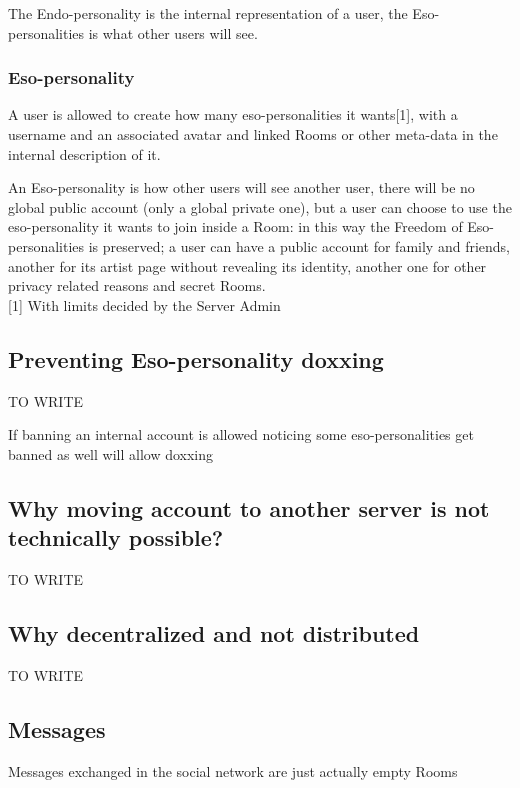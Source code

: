 \documentclass[12pt]{article}
\begin{document}
The Endo-personality is the internal representation of a user, the Eso-personalities is what other users will see.

\subsubsection*{Eso-personality}

A user is allowed to create how many eso-personalities it wants[1], with a username and an associated avatar and linked Rooms or other meta-data in the internal description of it.

An Eso-personality is how other users will see another user, there will be no global public account (only a global private one), but a user can choose to use the eso-personality it wants to join inside a Room: in this way the Freedom of Eso-personalities is preserved; a user can have a public account for family and friends, another for its artist page without revealing its identity, another one for other privacy related reasons and secret Rooms. \\

[1] With limits decided by the Server Admin

\subsection{Preventing Eso-personality doxxing}

TO WRITE

If banning an internal account is allowed noticing some eso-personalities get banned as well will allow doxxing

\subsection{Why moving account to another server is not technically possible?}

TO WRITE

\subsection{Why decentralized and not distributed}

TO WRITE


\subsection{Messages}

Messages exchanged in the social network are just actually empty Rooms
\end{document}
